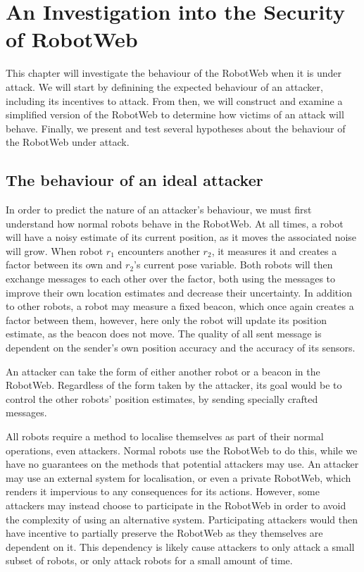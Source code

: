 \chapter{An Investigation into the Security of RobotWeb}
This chapter will investigate the behaviour of the RobotWeb when it is under attack. We will start by definining the expected behaviour of an attacker, including its incentives to attack. From then, we will construct and examine a simplified version of the RobotWeb to determine how victims of an attack will behave. Finally, we present and test several hypotheses about the behaviour of the RobotWeb under attack.

\section{The behaviour of an ideal attacker}
In order to predict the nature of an attacker's behaviour, we must first understand how normal robots behave in the RobotWeb. At all times, a robot will have a noisy estimate of its current position, as it moves the associated noise will grow. When robot $r_1$ encounters another $r_2$, it measures it and creates a factor between its own and $r_2$'s current pose variable. Both robots will then exchange messages to each other over the factor, both using the messages to improve their own location estimates and decrease their uncertainty. In addition to other robots, a robot may measure a fixed beacon, which once again creates a factor between them, however, here only the robot will update its position estimate, as the beacon does not move. The quality of all sent message is dependent on the sender's own position accuracy and the accuracy of its sensors.

An attacker can take the form of either another robot or a beacon in the RobotWeb. Regardless of the form taken by the attacker, its goal would be to control the other robots' position estimates, by sending specially crafted messages.

All robots require a method to localise themselves as part of their normal operations, even attackers. Normal robots use the RobotWeb to do this, while we have no guarantees on the methods that potential attackers may use. An attacker may use an external system for localisation, or even a private RobotWeb, which renders it impervious to any consequences for its actions. However, some attackers may instead choose to participate in the RobotWeb in order to avoid the complexity of using an alternative system. Participating attackers would then have incentive to partially preserve the RobotWeb as they themselves are dependent on it. This dependency is likely cause attackers to only attack a small subset of robots, or only attack robots for a small amount of time. 

